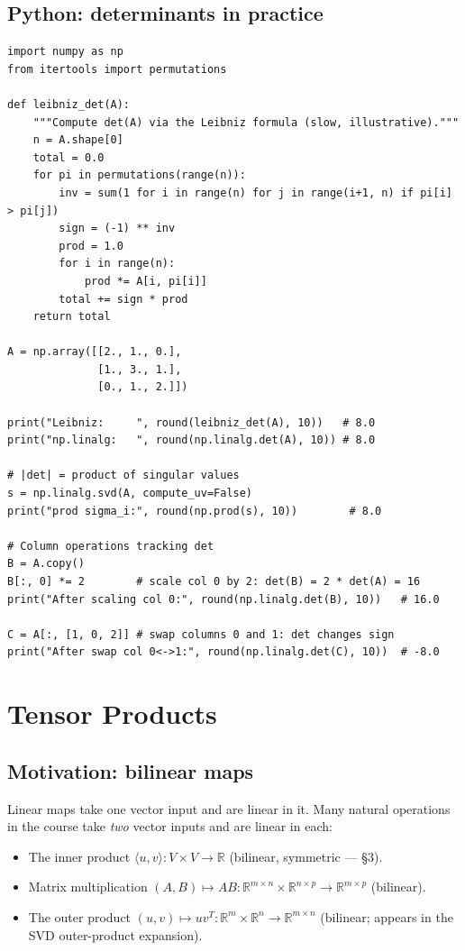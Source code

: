 \documentclass[11pt]{article}
\theoremstyle{definition}
\theoremstyle{plain}
\begin{document}
\subsection{Python: determinants in practice}
\begin{lstlisting}
import numpy as np
from itertools import permutations

def leibniz_det(A):
    """Compute det(A) via the Leibniz formula (slow, illustrative)."""
    n = A.shape[0]
    total = 0.0
    for pi in permutations(range(n)):
        inv = sum(1 for i in range(n) for j in range(i+1, n) if pi[i] > pi[j])
        sign = (-1) ** inv
        prod = 1.0
        for i in range(n):
            prod *= A[i, pi[i]]
        total += sign * prod
    return total

A = np.array([[2., 1., 0.],
              [1., 3., 1.],
              [0., 1., 2.]])

print("Leibniz:     ", round(leibniz_det(A), 10))   # 8.0
print("np.linalg:   ", round(np.linalg.det(A), 10)) # 8.0

# |det| = product of singular values
s = np.linalg.svd(A, compute_uv=False)
print("prod sigma_i:", round(np.prod(s), 10))        # 8.0

# Column operations tracking det
B = A.copy()
B[:, 0] *= 2        # scale col 0 by 2: det(B) = 2 * det(A) = 16
print("After scaling col 0:", round(np.linalg.det(B), 10))   # 16.0

C = A[:, [1, 0, 2]] # swap columns 0 and 1: det changes sign
print("After swap col 0<->1:", round(np.linalg.det(C), 10))  # -8.0
\end{lstlisting}



\section{Tensor Products}

\subsection{Motivation: bilinear maps}

Linear maps take one vector input and are linear in it.  Many natural
operations in the course take \emph{two} vector inputs and are linear in
each:
\begin{itemize}
  \item The inner product $\langle u,v\rangle: V\times V\to\mathbb{R}$
        (bilinear, symmetric --- \S3).
  \item Matrix multiplication $(A,B)\mapsto AB:
        \mathbb{R}^{m\times n}\times\mathbb{R}^{n\times p}
        \to\mathbb{R}^{m\times p}$ (bilinear).
  \item The outer product $(u,v)\mapsto uv^T:
        \mathbb{R}^m\times\mathbb{R}^n\to\mathbb{R}^{m\times n}$
        (bilinear; appears in the SVD outer-product expansion).
\end{itemize}
\end{document}
